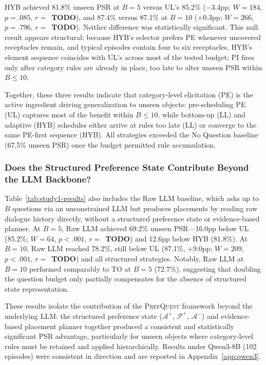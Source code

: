 \documentclass[manuscript,review,anonymous]{acmart}
\newcommand{\revend}{\color{black}}       %
\renewcommand{\revend}{}
\begin{document}
{HYB achieved 81.8\% unseen PSR at $B=5$ versus UL's 85.2\% ($-$3.4pp; $W = 184$, $p = .085$, $r = $~\textbf{TODO}), and 87.4\% versus 87.1\% at $B=10$ ($+$0.3pp; $W = 266$, $p = .796$, $r = $~\textbf{TODO}). Neither difference was statistically significant. This null result appears structural: because HYB's selector prefers PE whenever uncovered receptacles remain, and typical episodes contain four to six receptacles, HYB's element sequence coincides with UL's across most of the tested budget; PI fires only after category rules are already in place, too late to alter unseen PSR within $B \leq 10$.

Together, these three results indicate that category-level elicitation (PE) is the active ingredient driving generalization to unseen objects: pre-scheduling PE (UL) captures most of the benefit within $B \leq 10$, while bottom-up (LL) and adaptive (HYB) schedules either arrive at rules too late (LL) or converge to the same PE-first sequence (HYB). All strategies exceeded the No Question baseline (67.5\% unseen PSR) once the budget permitted rule accumulation.

\subsubsection{Does the Structured Preference State Contribute Beyond the LLM Backbone?}

Table~\ref{tab:study1-results} also includes the Raw LLM baseline, which asks up to $B$ questions via an unconstrained LLM but produces placements by reading raw dialogue history directly, without a structured preference state or evidence-based planner. At $B=5$, Raw LLM achieved 69.2\% unseen PSR---16.0pp below UL (85.2\%; $W = 64$, $p < .001$, $r = $~\textbf{TODO}) and 12.6pp below HYB (81.8\%). At $B=10$, Raw LLM reached 78.2\%, still below UL (87.1\%, $+$9.0pp; $W = 209$, $p < .001$, $r = $~\textbf{TODO}) and all structured strategies. Notably, Raw LLM at $B=10$ performed comparably to TO at $B=5$ (72.7\%), suggesting that doubling the question budget only partially compensates for the absence of structured state representation.

These results isolate the contribution of the \textsc{PrefQuest} framework beyond the underlying LLM: the structured preference state ($\mathcal{A}^+$, $\mathcal{P}^+$, $\mathcal{A}^-$) and evidence-based placement planner together produced a consistent and statistically significant PSR advantage, particularly for unseen objects where category-level rules must be retained and applied hierarchically. Results under Qwen3-8B (102 episodes) were consistent in direction and are reported in Appendix~\ref{app:qwen3}.

\revend}
\end{document}
